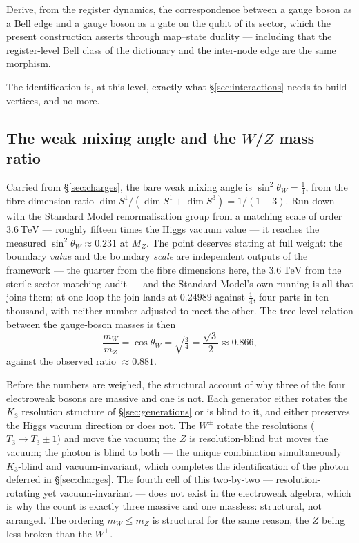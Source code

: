 \begin{openproblem}\label{op:state-gate}
Derive, from the register dynamics, the correspondence between a gauge boson as a Bell edge and a
gauge boson as a gate on the qubit of its sector, which the present construction asserts through
map--state duality --- including that the register-level Bell class of the dictionary and the
inter-node edge are the same morphism.
\end{openproblem}

The identification is, at this level, exactly what \S\ref{sec:interactions} needs to build vertices,
and no more.

\subsection{The weak mixing angle and the \texorpdfstring{$W$/$Z$}{W/Z} mass ratio}
\label{sec:weak-mixing-angle}

Carried from \S\ref{sec:charges}, the bare weak mixing angle is $\sin^2\theta_W = \tfrac14$, from the
fibre-dimension ratio $\dim S^1/(\dim S^1 + \dim S^3) = 1/(1+3)$. Run down with the Standard Model
renormalisation group from a matching scale of order $3.6\ \mathrm{TeV}$ --- roughly fifteen times
the Higgs vacuum value --- it reaches the measured $\sin^2\theta_W \approx 0.231$ at $M_Z$. The
point deserves stating at full weight: the boundary \emph{value} and the boundary \emph{scale} are
independent outputs of the framework --- the quarter from the fibre dimensions here, the
$3.6\ \mathrm{TeV}$ from the sterile-sector matching audit --- and the Standard Model's own
running is all that joins them; at one loop the join lands at $0.24989$ against $\tfrac14$, four
parts in ten thousand, with neither number adjusted to meet the other. The tree-level
relation between the gauge-boson masses is then
\begin{equation}
  \frac{m_W}{m_Z} = \cos\theta_W = \sqrt{\tfrac34} = \frac{\sqrt3}{2} \approx 0.866,
\end{equation}
against the observed ratio $\approx 0.881$.

Before the numbers are weighed, the structural account of why three of the four electroweak bosons
are massive and one is not. Each generator either rotates the $K_3$ resolution structure of
\S\ref{sec:generations} or is blind to it, and either preserves the Higgs vacuum direction or does
not. The $W^\pm$ rotate the resolutions ($T_3 \to T_3 \pm 1$) and move the vacuum; the $Z$ is
resolution-blind but moves the vacuum; the photon is blind to both --- the unique combination
simultaneously $K_3$-blind and vacuum-invariant, which completes the identification of the photon
deferred in \S\ref{sec:charges}. The fourth cell of this two-by-two --- resolution-rotating yet
vacuum-invariant --- does not exist in the electroweak algebra, which is why the count is exactly
three massive and one massless: structural, not arranged. The ordering $m_W \le m_Z$ is structural
for the same reason, the $Z$ being less broken than the $W^\pm$.

